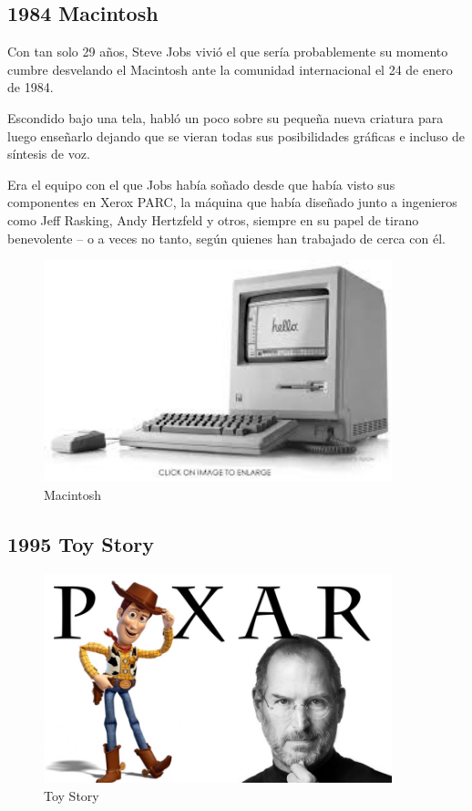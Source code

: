\documentclass[notumble,10pt,a4paper]{leaflet}
\begin{document}
\newpage
\subsection{\large{1984 Macintosh}}
Con tan solo 29 años, Steve Jobs vivió el que sería probablemente su momento cumbre desvelando el Macintosh ante la comunidad internacional el 24 de enero de 1984.

Escondido bajo una tela, habló un poco sobre su pequeña nueva criatura para luego enseñarlo dejando que se vieran todas sus posibilidades gráficas e incluso de síntesis de voz.

Era el equipo con el que Jobs había soñado desde que había visto sus componentes en Xerox PARC, la máquina que había diseñado junto a ingenieros como Jeff Rasking, Andy Hertzfeld y otros, siempre en su papel de tirano benevolente – o a veces no tanto, según quienes han trabajado de cerca con él.

\begin{figure}[b]
	\centering
	\includegraphics[width=0.9\textwidth]{img/mac.jpeg}
	\caption{Macintosh}
\end{figure}

\newpage

\subsection{\large{1995 Toy Story}}
\begin{figure}[b]
	\centering
	\includegraphics[width=0.9\textwidth]{img/pixar.jpg}
	\caption{Toy Story}
\end{figure}
\end{document}
